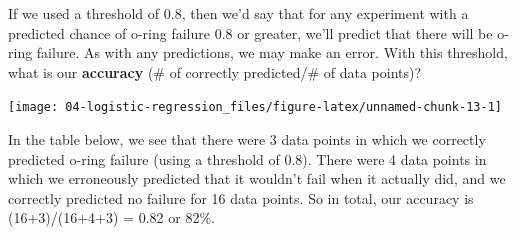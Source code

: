 \documentclass[
]{book}
\newenvironment{Shaded}{\begin{snugshade}}{\end{snugshade}}
\newcommand{\CommentTok}[1]{\textcolor[rgb]{0.56,0.35,0.01}{\textit{#1}}}
\newcommand{\DataTypeTok}[1]{\textcolor[rgb]{0.13,0.29,0.53}{#1}}
\newcommand{\FloatTok}[1]{\textcolor[rgb]{0.00,0.00,0.81}{#1}}
\newcommand{\KeywordTok}[1]{\textcolor[rgb]{0.13,0.29,0.53}{\textbf{#1}}}
\newcommand{\NormalTok}[1]{#1}
\newcommand{\OperatorTok}[1]{\textcolor[rgb]{0.81,0.36,0.00}{\textbf{#1}}}
\newcommand{\StringTok}[1]{\textcolor[rgb]{0.31,0.60,0.02}{#1}}
\begin{document}
If we used a threshold of 0.8, then we'd say that for any experiment with a predicted chance of o-ring failure 0.8 or greater, we'll predict that there will be o-ring failure. As with any predictions, we may make an error. With this threshold, what is our \textbf{accuracy} (\# of correctly predicted/\# of data points)?

\begin{Shaded}
\end{Shaded}

\begin{center}\texttt{[image: 04-logistic-regression\_files/figure-latex/unnamed-chunk-13-1]} \end{center}

In the table below, we see that there were 3 data points in which we correctly predicted o-ring failure (using a threshold of 0.8). There were 4 data points in which we erroneously predicted that it wouldn't fail when it actually did, and we correctly predicted no failure for 16 data points. So in total, our accuracy is (16+3)/(16+4+3) = 0.82 or 82\%.

\begin{Shaded}
\end{Shaded}
\end{document}
